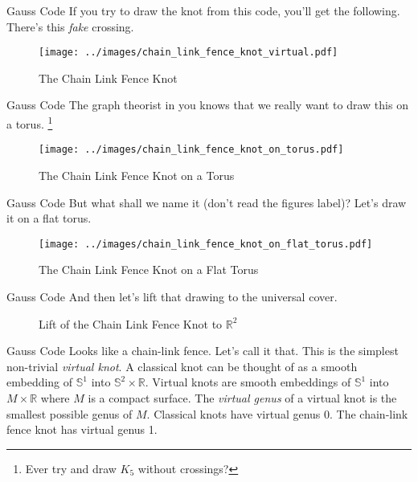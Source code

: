 \documentclass{beamer}
\begin{document}
    \begin{frame}{Gauss Code}
        If you try to draw the knot from this code, you'll get the following.
        There's this \textit{fake} crossing.
        \begin{figure}
            \centering
            \texttt{[image: ../images/chain\_link\_fence\_knot\_virtual.pdf]}
            \caption{The Chain Link Fence Knot}
            \label{fig:chain_link_fence_knot}
        \end{figure}
    \end{frame}
    \begin{frame}{Gauss Code}
        The graph theorist in you knows that we really want to draw this on a
        torus.%
        \footnote{Ever try and draw $K_{5}$ without crossings?}
        \begin{figure}
            \centering
            \texttt{[image: ../images/chain\_link\_fence\_knot\_on\_torus.pdf]}
            \caption{The Chain Link Fence Knot on a Torus}
            \label{fig:chain_link_fence_knot_on_torus}
        \end{figure}
    \end{frame}
    \begin{frame}{Gauss Code}
        But what shall we name it (don't read the figures label)?
        Let's draw it on a flat torus.
        \begin{figure}
            \centering
            \texttt{[image: ../images/chain\_link\_fence\_knot\_on\_flat\_torus.pdf]}
            \caption{The Chain Link Fence Knot on a Flat Torus}
            \label{fig:chain_link_fence_knot_on_flat_torus}
        \end{figure}
    \end{frame}
    \begin{frame}{Gauss Code}
        And then let's lift that drawing to the universal cover.
        \begin{figure}
            \centering
            \caption{Lift of the Chain Link Fence Knot to $\mathbb{R}^{2}$}
            \label{fig:chain_link_fence_knot_on_flat_torus_universal_cover}
        \end{figure}
    \end{frame}
    \begin{frame}{Gauss Code}
        Looks like a chain-link fence. Let's call it that. This is the simplest
        non-trivial \textit{virtual knot}. A classical knot can be thought of
        as a smooth embedding of $\mathbb{S}^{1}$ into
        $\mathbb{S}^{2}\times\mathbb{R}$. Virtual knots are smooth embeddings
        of $\mathbb{S}^{1}$ into $M\times\mathbb{R}$ where $M$ is a compact
        surface. The \textit{virtual genus} of a virtual knot is the smallest
        possible genus of $M$. Classical knots have virtual genus 0. The
        chain-link fence knot has virtual genus 1.
    \end{frame}
\end{document}
